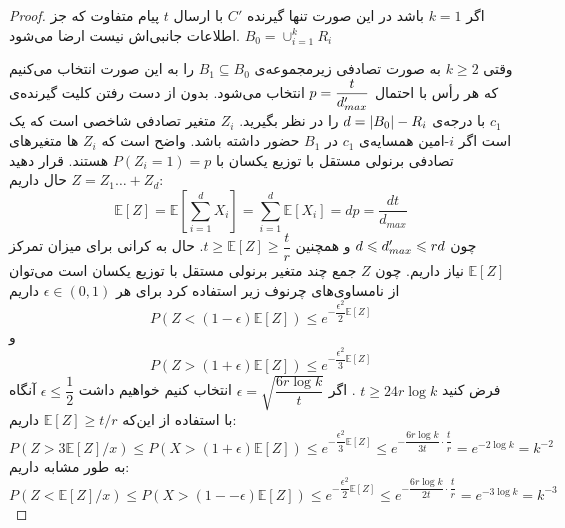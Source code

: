 \begin{proof}
    اگر
    $k = 1$
    باشد در این صورت تنها گیرنده
    $C'$
    با ارسال
    $t$
    پیام متفاوت که جز اطلاعات جانبی‌اش نیست ارضا می‌شود.
    $B_0 = \cup_{i = 1}^{k} R_i$

    وقتی
    $k \geq 2$
    به صورت تصادفی زیرمجموعه‌ی
    $B_1 \subseteq B_0$
    را به این صورت انتخاب می‌کنیم که هر رأس با احتمال
    $p = \dfrac{t}{d_{max}'}$
    انتخاب می‌شود. بدون از دست رفتن کلیت گیرنده‌ی
    $c_1$
    با درجه‌ی
    $d = \left|{B_0}\right| - R_i$
    را در نظر بگیرید.
    $Z_i$
    متغیر تصادفی شاخصی است که یک است اگر
    $i$-امین همسایه‌ی
    $c_1$
    در
    $B_1$
    حضور داشته باشد. واضح است که
    $Z_i$
    ها متغیرهای تصادفی برنولی مستقل با توزیع یکسان با
    $P(Z_i = 1) = p$
    هستند. قرار دهید
    $Z = Z_1 \ldots + Z_d$
    حال داریم:
    \begin{equation}
        \mathbb{E}[Z] = \mathbb{E}[\sum\limits_{i = 1}^{d} X_i ] = \sum\limits_{i = 1}^{d} \mathbb{E}[X_i] = dp = \dfrac{dt}{d_{max}}
    \end{equation}
    چون
    $d \leqslant d_{max}' \leqslant rd$
    و همچنین
    $t \geq \mathbb{E}[Z] \geq \dfrac{t}{r}$. حال به کرانی برای میزان تمرکز
    $\mathbb{E}[Z]$
    نیاز داریم. چون
    $Z$
    جمع چند متغیر برنولی مستقل با توزیع یکسان است می‌توان از نامساوی‌های چرنوف زیر استفاده کرد
    \cite{Dubhashi_Panconesi_2009}
    برای هر
    $\epsilon \in (0, 1)$
    داریم
    $$P(Z < (1 - \epsilon) \mathbb{E}[Z]) \leq e^{- \dfrac{\epsilon^2}{2} \mathbb{E}[Z]}$$
    و
    $$P(Z > (1 + \epsilon) \mathbb{E}[Z]) \leq e^{- \dfrac{\epsilon^2}{3} \mathbb{E}[Z]}$$
    فرض کنید
    $t \geq 24 r \log k$
    . اگر
    $\epsilon = \sqrt{\dfrac{6r \log k}{t}}$
    انتخاب کنیم خواهیم داشت
    $\epsilon \leq \dfrac{1}{2}$
    آنگاه با استفاده از این‌که
    $\mathbb{E}[Z] \geq t/r$
    داریم:
    \begin{equation}
        P(Z > 3 \mathbb{E}[Z]/x) \leq P(X > (1 + \epsilon) \mathbb{E}[Z]) \leq e^{-\dfrac{\epsilon^2}{3} \mathbb{E}[Z]} \leq e^{- \dfrac{6 r \log k}{3 t} \cdot \dfrac{t}{r}} = e^{- 2 \log k} = k^{-2}
    \end{equation}
    به طور مشابه داریم:
    \begin{equation}
        P(Z < \mathbb{E}[Z]/x) \leq P(X > (1 -- \epsilon) \mathbb{E}[Z]) \leq e^{-\dfrac{\epsilon^2}{2} \mathbb{E}[Z]} \leq e^{- \dfrac{6 r \log k}{2 t} \cdot \dfrac{t}{r}} = e^{-3 \log k} = k^{-3}
    \end{equation}


\end{proof}
